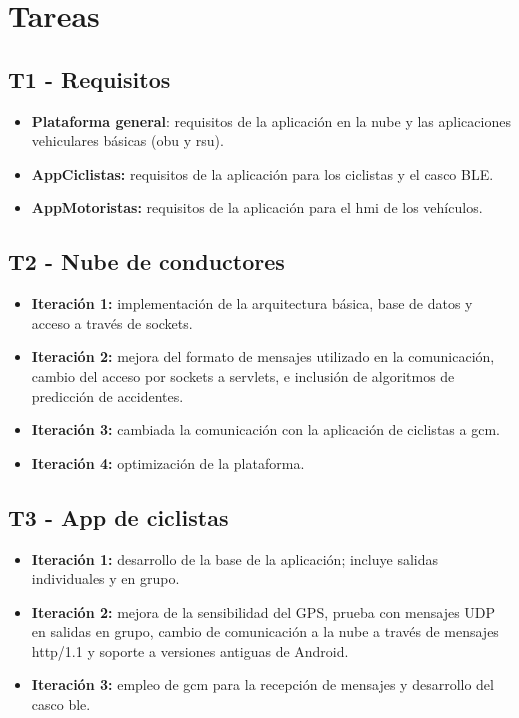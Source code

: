 \section{Tareas}
\subsection{T1 - Requisitos}
\begin{itemize}
	\item \textbf{Plataforma general}: requisitos de la aplicación en la nube y las aplicaciones vehiculares básicas (\gls{obu} y \gls{rsu}).
	\item \textbf{AppCiclistas:} requisitos de la aplicación para los ciclistas y el casco BLE.
	\item \textbf{AppMotoristas:} requisitos de la aplicación para el \gls{hmi} de los vehículos.
\end{itemize}

\subsection{T2 - Nube de conductores}
\begin{itemize}
	\item \textbf{Iteración 1:} implementación de la arquitectura básica, base de datos y acceso a través de sockets.
	\item \textbf{Iteración 2:} mejora del formato de mensajes utilizado en la comunicación, cambio del acceso por sockets a servlets, e inclusión de algoritmos de predicción de accidentes.
	\item \textbf{Iteración 3:} cambiada la comunicación con la aplicación de ciclistas a \gls{gcm}.
	\item \textbf{Iteración 4:} optimización de la plataforma.
\end{itemize}

\subsection{T3 - App de ciclistas}
\begin{itemize}
	\item \textbf{Iteración 1:} desarrollo de la base de la aplicación; incluye salidas individuales y en grupo.
	\item \textbf{Iteración 2:} mejora de la sensibilidad del GPS, prueba con mensajes UDP en salidas en grupo, cambio de comunicación a la nube a través de mensajes \Gls{http/1.1} y soporte a versiones antiguas de Android.
	\item \textbf{Iteración 3:} empleo de \gls{gcm} para la recepción de mensajes y desarrollo del casco \gls{ble}.
\end{itemize}

